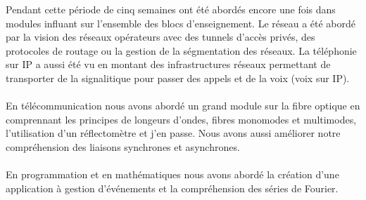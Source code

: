 \begin{resumo}
    Pendant cette période de cinq semaines ont été abordés encore une fois dans modules influant sur l'ensemble des blocs d'enseignement. Le réseau a été abordé par la vision des réseaux opérateurs avec des tunnels d'accès privés, des protocoles de routage ou la gestion de la ségmentation des réseaux. La téléphonie sur IP a aussi été vu en montant des infrastructures réseaux permettant de transporter de la signalitique pour passer des appels et de la voix (voix sur IP).
    \\ \\
    En télécommunication nous avons abordé un grand module sur la fibre optique en comprennant les principes de longeurs d'ondes, fibres monomodes et multimodes, l'utilisation d'un réflectomètre et j'en passe. Nous avons aussi améliorer notre compréhension des liaisons synchrones et asynchrones.
    \\ \\
    En programmation et en mathématiques nous avons abordé la création d'une application à gestion d'événements et la compréhension des séries de Fourier.
    
\end{resumo}